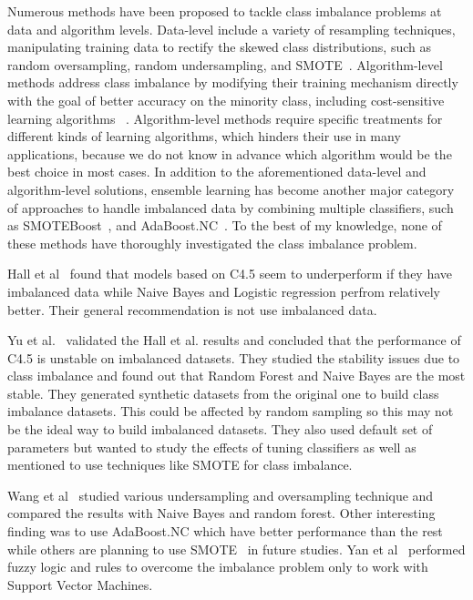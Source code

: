 \documentclass[sigconf]{acmart}
\theoremstyle{break}
\begin{document}
Numerous methods have been proposed to tackle class
imbalance problems at data and algorithm levels. Data-level include a variety of resampling techniques, manipulating training data to rectify the skewed class distributions, such as random oversampling, random undersampling, and SMOTE~\cite{estabrooks2004multiple}. Algorithm-level methods address class imbalance by
modifying their training mechanism directly with the 
goal of better accuracy on the minority class, including cost-sensitive learning algorithms ~\cite{he2009learning}.
Algorithm-level methods require specific treatments for different
kinds of learning algorithms, which hinders their use
in many applications, because we do not know in advance
which algorithm would be the best choice in most cases. In addition to the aforementioned data-level and algorithm-level solutions, ensemble learning has become another major category of approaches to handle imbalanced data by combining multiple classifiers, such as SMOTEBoost~\cite{chawla2003smoteboost}, and
AdaBoost.NC~\cite{wang2010negative}. To 
the best of my knowledge, none of these methods have  thoroughly investigated the class imbalance problem.

Hall et al~\cite{hall2012systematic} found that models based on C4.5 seem to underperform if they have imbalanced data while Naive Bayes and Logistic regression perfrom relatively better. 
Their general recommendation is not use
imbalanced data.  

Yu et al.~\cite{yuperformance} validated the Hall et al. results and concluded that the
performance of C4.5 is unstable on imbalanced datasets. They studied the stability issues due to  class imbalance and found out that Random Forest and Naive Bayes are the most stable. They generated synthetic datasets from the original one to build class imbalance datasets. This could be affected by random sampling 
so this may not be the ideal way to build imbalanced datasets. They also used default set of parameters but wanted to study the effects of tuning classifiers as well as mentioned to use techniques like SMOTE for class imbalance.

Wang et al~\cite{wang2013using} studied various undersampling and oversampling technique and compared the results with Naive Bayes and random forest. Other interesting finding was to use AdaBoost.NC which have better performance than the rest while others are planning to use SMOTE~\cite{gray2009using} in future studies. Yan et al~\cite{yan2010software} performed fuzzy logic and rules to overcome the imbalance problem only to work with Support Vector Machines. 
\end{document}
